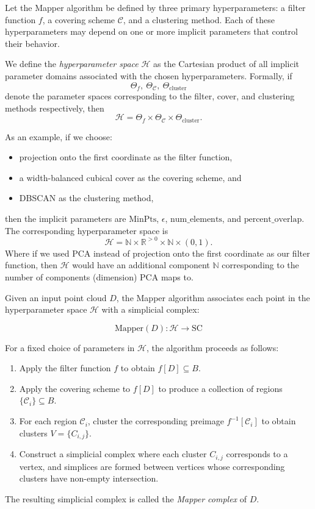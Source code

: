 \begin{definition}
Let the Mapper algorithm be defined by three primary hyperparameters:
a filter function $f$, a covering scheme $\mathcal{C}$, and a clustering method.
Each of these hyperparameters may depend on one or more implicit parameters 
that control their behavior. 

We define the \emph{hyperparameter space} $\mathcal{H}$ as the Cartesian product 
of all implicit parameter domains associated with the chosen hyperparameters.
Formally, if 
$$
  \Theta_f, \ \Theta_{\mathcal{C}}, \ \Theta_{\text{cluster}}
$$
denote the parameter spaces corresponding to the filter, cover, and clustering 
methods respectively, then
$$
  \mathcal{H} = \Theta_f \times \Theta_{\mathcal{C}} \times \Theta_{\text{cluster}}.
$$

As an example, if we choose:
\begin{itemize}
  \item projection onto the first coordinate as the filter function, 
  \item a width-balanced cubical cover as the covering scheme, and 
  \item DBSCAN as the clustering method,
\end{itemize}
then the implicit parameters are $\text{MinPts}$, $\epsilon$, 
$\text{num\_elements}$, and $\text{percent\_overlap}$. The corresponding 
hyperparameter space is
$$
  \mathcal{H} = \mathbb{N} \times \mathbb{R}^{>0} \times \mathbb{N} \times (0,1).
$$
Where if we used PCA instead of projection onto the first coordinate as our 
filter function, then $\mathcal{H}$ would have an additional component $\mathbb{N}$ 
corresponding to the number of components (dimension) PCA maps to.
\end{definition}

\begin{definition}
Given an input point cloud $D$, the Mapper algorithm associates each point in the 
hyperparameter space $\mathcal{H}$ with a simplicial complex:

$$
  \text{Mapper}(D): \mathcal{H} \rightarrow \text{SC}
$$

For a fixed choice of parameters in $\mathcal{H}$, the algorithm proceeds as follows:
\begin{enumerate}
  \item Apply the filter function $f$ to obtain $f[D] \subseteq B$.
  \item Apply the covering scheme to $f[D]$ to produce a collection of regions 
  $\{ \mathcal{C}_i \} \subseteq B$.
  \item For each region $\mathcal{C}_i$, cluster the corresponding preimage 
  $f^{-1}[\mathcal{C}_i]$ to obtain clusters $V = \{ C_{i,j} \}$.
  \item Construct a simplicial complex where each cluster $C_{i,j}$ corresponds 
  to a vertex, and simplices are formed between vertices whose corresponding clusters 
  have non-empty intersection.
\end{enumerate}
The resulting simplicial complex is called the \emph{Mapper complex} of $D$.
\end{definition}

